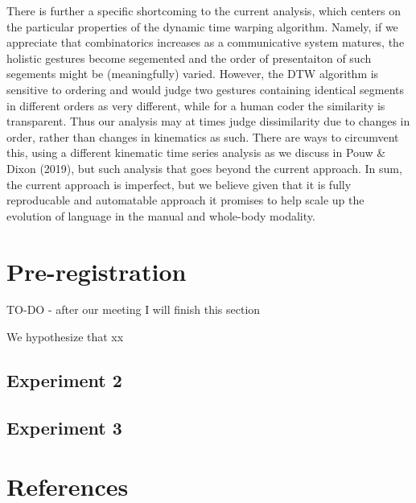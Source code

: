 \documentclass[
  man, noextraspace,floatsintext]{apa6}
\begin{document}
There is further a specific shortcoming to the current analysis, which centers on the particular properties of the dynamic time warping algorithm. Namely, if we appreciate that combinatorics increases as a communicative system matures, the holistic gestures become segemented and the order of presentaiton of such segements might be (meaningfully) varied. However, the DTW algorithm is sensitive to ordering and would judge two gestures containing identical segments in different orders as very different, while for a human coder the similarity is transparent. Thus our analysis may at times judge dissimilarity due to changes in order, rather than changes in kinematics as such. There are ways to circumvent this, using a different kinematic time series analysis as we discuss in Pouw \& Dixon (2019), but such analysis that goes beyond the current approach. In sum, the current approach is imperfect, but we believe given that it is fully reproducable and automatable approach it promises to help scale up the evolution of language in the manual and whole-body modality.

\hypertarget{pre-registration}{%
\section{Pre-registration}\label{pre-registration}}

TO-DO - after our meeting I will finish this section

We hypothesize that xx

\hypertarget{experiment-2}{%
\subsection{Experiment 2}\label{experiment-2}}

\hypertarget{experiment-3}{%
\subsection{Experiment 3}\label{experiment-3}}

\hypertarget{references}{%
\section{References}\label{references}}

\begingroup
\setlength{\parindent}{-0.5in}
\setlength{\leftskip}{0.5in}
\end{document}
